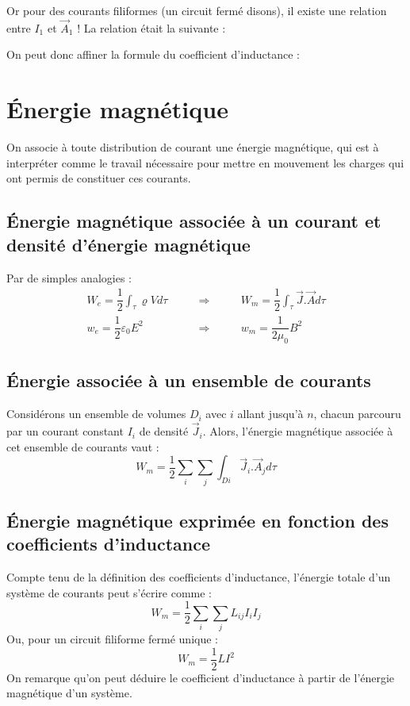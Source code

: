 \documentclass[12pt]{book}
\begin{document}
Or pour des courants filiformes (un circuit fermé disons), il existe une relation entre $I_1$ et $\vec{A}_1$ ! La relation était la suivante :

On peut donc affiner la formule du coefficient d'inductance :


\section{Énergie magnétique}
On associe à toute distribution de courant une énergie magnétique, qui est à interpréter comme le travail nécessaire pour mettre en mouvement les charges qui ont permis de constituer ces courants.
\subsection{Énergie magnétique associée à un courant et densité d'énergie magnétique}
Par de simples analogies :
\begin{eqnarray*}
W_e = \dfrac{1}{2} \int_\tau \varrho V d\tau \qquad &\Rightarrow& \qquad W_m = \dfrac{1}{2} \int_\tau \vec{J}.\vec{A} d\tau \\
w_e = \dfrac{1}{2} \varepsilon_0 E^2 \qquad &\Rightarrow & \qquad w_m = \dfrac{1}{2\mu_0} B^2
\end{eqnarray*}
\subsection{Énergie associée à un ensemble de courants}
Considérons un ensemble de volumes $D_i$ avec $i$ allant jusqu'à $n$, chacun parcouru par un courant constant $I_i$ de densité $\vec{J}_i$. Alors, l'énergie magnétique associée à cet ensemble de courants vaut :
$$W_m = \dfrac{1}{2} \sum_i \sum_j \int_{Di} \vec{J}_i.\vec{A}_j d\tau$$
\subsection{Énergie magnétique exprimée en fonction des coefficients d'inductance}
Compte tenu de la définition des coefficients d'inductance, l'énergie totale d'un système de courants peut s'écrire comme : $$W_m = \dfrac{1}{2} \sum_i \sum_j L_{ij} I_i I_j $$
Ou, pour un circuit filiforme fermé unique : $$W_m = \dfrac{1}{2}LI^2$$
On remarque qu'on peut déduire le coefficient d'inductance à partir de l'énergie magnétique d'un système.
\end{document}
